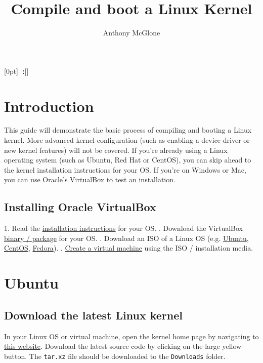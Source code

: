 \documentclass[12pt,a4paper]{report}
\author{Anthony McGlone}\title{Compile and boot a Linux Kernel}
\newcommand{\setupname}[1][\chaptername]{
\titlecontents{chapter}[0pt]{\vspace{1ex}}{\bfseries#1~\thecontentslabel:\quad}{\bfseries}{\bfseries\hfill\contentspage}[]
}
\begin{document}
\maketitle

\tableofcontents

\setupname
\chapter{Introduction}

This guide will demonstrate the basic process of compiling and booting a Linux kernel. More advanced kernel configuration (such as enabling a device driver or new kernel features) will not be covered. 
\newline
\newline
If you're already using a Linux operating system (such as Ubuntu, Red Hat or CentOS), you can skip ahead to the kernel installation instructions for your OS. 
\newline
\newline
If you're on Windows or Mac, you can use Oracle's VirtualBox to test an installation.

\section{Installing Oracle VirtualBox}

1. Read the \href{https://www.virtualbox.org/manual/ch02.html}{installation instructions} for your OS.
. Download the VirtualBox \href{https://www.virtualbox.org/wiki/Downloads}{binary / package} for your OS.
. Download an ISO of a Linux OS (e.g. \href{https://ubuntu.com/download/desktop}{Ubuntu}, \href{https://www.centos.org/download/}{CentOS}, \href{https://getfedora.org/workstation/download/}{Fedora}).
. \href{https://docs.oracle.com/cd/E26217_01/E26796/html/qs-create-vm.html}{Create a virtual machine} using the ISO / installation media.



\chapter{Ubuntu}
\section{Download the latest Linux kernel}
In your Linux OS or virtual machine, open the kernel home page by navigating to \href{https://www.kernel.org/}{this website}. Download the latest source code by clicking on the large yellow button.
\newline
\newline
The \texttt{tar.xz} file should be downloaded to the \texttt{Downloads} folder. 
\end{document}
